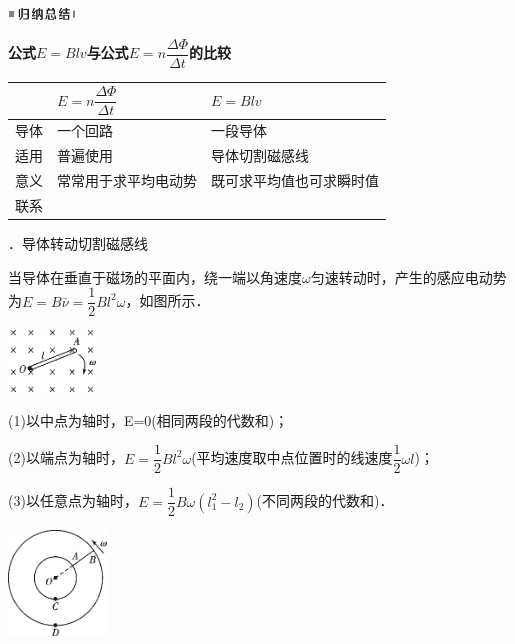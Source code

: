 \documentclass[cn,10.5pt,chinese,mac,chinesefont=founder]{elegantbook}
\begin{document}
\begin{center}\includegraphics[width=0.70764in,height=0.12292in]{media/image13.png}\end{center}
\begin{center}
	\textbf{公式$E=Blv$与公式$E=n \dfrac{\Delta \Phi}{\Delta t}$的比较}
\end{center}

\begin{longtable}[]{@{}m{1cm}m{6cm}m{5cm}@{}}
\toprule
& $E=n \dfrac{\Delta \Phi}{\Delta t}$ & $E=Blv$\tabularnewline
\midrule
\endhead
导体 & 一个回路 & 一段导体\tabularnewline
适用 & 普遍使用 & 导体切割磁感线\tabularnewline
意义 & 常常用于求平均电动势&既可求平均值也可求瞬时值\tabularnewline
联系 & \tabularnewline
\bottomrule
\end{longtable}

．导体转动切割磁感线

当导体在垂直于磁场的平面内，绕一端以角速度$\omega$匀速转动时，产生的感应电动势为$E=B \bar{\nu}=\dfrac{1}{2} B l^{2} \omega$，如图所示．

\begin{center}\includegraphics[width=0.91528in,height=0.64167in]{media/image413.png}\end{center}

(1)以中点为轴时，E=0(相同两段的代数和)；

(2)以端点为轴时，$E=\dfrac{1}{2} B l^{2} \omega$(平均速度取中点位置时的线速度$\dfrac{1}{2}\omega l$)；

(3)以任意点为轴时，$E=\dfrac{1}{2} B \omega\left(l_{1}^{2}-l_{2}\right)$(不同两段的代数和)．

\begin{center}\includegraphics[width=1.0375in,height=1.10347in]{media/image414.png}\end{center}
\end{document}
